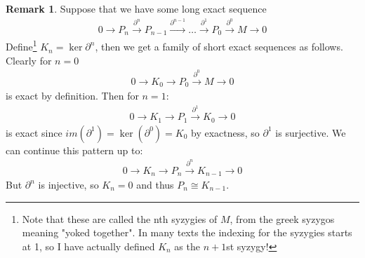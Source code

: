 \documentclass[12pt]{book}
\theoremstyle{definition}
\newtheorem{remark}[theorem]{Remark}
\begin{document}
\begin{remark}
    Suppose that we have some long exact sequence 
    \begin{align*}
        0 \rightarrow P_n \xrightarrow{\partial^{n}} P_{n-1} \xrightarrow{\partial^{n-1}} \dots \xrightarrow{\partial^1} P_0 \xrightarrow{\partial^0} M \rightarrow 0
    \end{align*}
    Define\footnote{Note that these are called the nth syzygies of $M$, from the greek syzygos meaning "yoked together". In many texts the indexing for the syzygies starts at 1, so I have actually defined $K_n$ as the $n+1$st syzygy!} $K_n = \ker{\partial^n}$, then we get a family of short exact sequences as follows. Clearly for $n = 0$
    \begin{align*}
        0 \rightarrow K_0 \rightarrow P_0 \xrightarrow{\partial^0} M \rightarrow 0 
    \end{align*}
    is exact by definition. Then for $n=1$:
    \begin{align*}
        0 \rightarrow K_1 \rightarrow P_1 \xrightarrow{\partial^1} K_0 \rightarrow 0 
    \end{align*}
    is exact since $im(\partial^1) = \ker(\partial^0) = K_0$ by exactness, so $\partial^1$ is surjective. We can continue this pattern up to: 
    \begin{align*}
        0 \rightarrow K_n \rightarrow P_n \xrightarrow{\partial^{n}} K_{n-1} \rightarrow 0 
    \end{align*}
    But $\partial^n$ is injective, so $K_n = 0$ and thus $P_n \cong K_{n-1}$. 
\end{remark}
\end{document}

